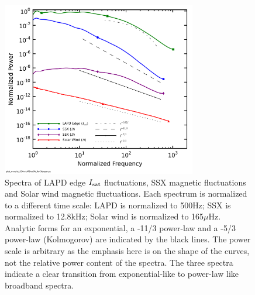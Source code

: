 \documentclass[aps,pre,twocolumn,secnumarabic,nobalancelastpage,amsmath,amssymb,
nofootinbib]{revtex4-1}
\begin{document}
\begin{figure}[!htbp]
\centerline{
\includegraphics[width=8.5cm]{spectra.png}}
\caption{\label{fig:spectra} Spectra of LAPD edge $I_{\rm sat}$ fluctuations, SSX magnetic fluctuations and Solar wind magnetic fluctuations. Each spectrum is normalized to a different time scale: LAPD is normalized to 500Hz; SSX is normalized to 12.8kHz; Solar wind is normalized to 165$\mu$Hz. Analytic forms for an exponential, a -11/3 power-law and a -5/3 power-law (Kolmogorov) are indicated by the black lines. The power scale is arbitrary as the emphasis here is on the shape of the curves, not the relative power content of the spectra. The three spectra indicate a clear transition from exponential-like to power-law like broadband spectra.}
\end{figure}
\end{document}
